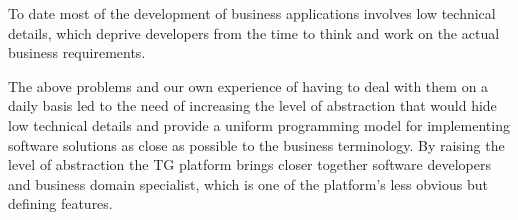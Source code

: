   To date most of the development of business applications involves low technical details, which deprive developers from the time to think and work on the actual business requirements.
  
  The above problems and our own experience of having to deal with them on a daily basis led to the need of increasing the level of abstraction that would hide low technical details and provide a uniform programming model for implementing software solutions as close as possible to the business terminology.
  By raising the level of abstraction the TG platform brings closer together software developers and business domain specialist, which is one of the platform's less obvious but defining features.

